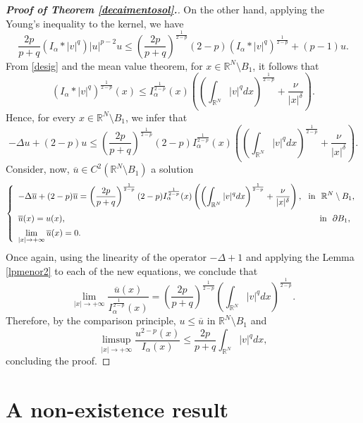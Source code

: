 \documentclass[12pt,a4paper]{article}
\numberwithin{equation}{section}
\begin{document}
\begin{proof}[\textbf{Proof of Theorem \ref{decaimentosol}.}]
On the other hand, applying the Young's inequality to the kernel, we have
$$
\dfrac{2p}{p+q}(I_\alpha \ast |v|^q)|u|^{p-2}u\leq \left(\dfrac{2p}{p+q}\right)^{\frac{1}{2-p}}(2-p)(I_\alpha \ast |v|^q)^{\frac{1}{2-p}}+(p-1)u. 
$$
From \eqref{desig} and the mean value theorem, for $x\in \mathbb{R}^N \setminus B_1$, it follows that
$$
(I_\alpha \ast |v|^q)^{\frac{1}{2-p}}(x) \leq I_{\alpha}^{\frac{1}{2-p}}(x)\left( \left(\int_{\mathbb{R}^N}|v|^q dx \right)^{\frac{1}{2-p}}+\dfrac{\nu}{|x|^\delta}\right).
$$
Hence, for every $x\in \mathbb{R}^N \setminus B_1$, we infer that
$$
    -\Delta u + (2-p)u  \leq \left(\dfrac{2p}{p+q}\right)^{\frac{1}{2-p}}(2-p)I_{\alpha}^{\frac{1}{2-p}}(x)\left( \left(\int_{\mathbb{R}^N}|v|^q dx \right)^{\frac{1}{2-p}}+\dfrac{\nu}{|x|^\delta}\right).
$$
Consider, now, $\overline{u}\in C^2(\mathbb{R}^N \setminus B_1)$ a solution 
$$
\left\{
\begin{array}{lll}
     -\Delta \overline{u} + (2-p)\overline{u} = \left(\dfrac{2p}{p+q}\right)^{\frac{1}{2-p}}(2-p)I_{\alpha}^{\frac{1}{2-p}}(x)\displaystyle\left( \left(\int_{\mathbb{R}^N}|v|^q dx \right)^{\frac{1}{2-p}}+\dfrac{\nu}{|x|^\delta}\right), \mbox{ \ in \ } \mathbb{R}^N \setminus B_1, \vspace{5pt}\\
     \overline{u}(x)=u(x), \ \ \ \ \ \ \ \ \ \ \ \ \ \ \ \ \ \ \ \ \ \ \ \ \ \ \ \ \ \ \ \ \ \ \ \ \ \ \ \ \ \ \ \ \ \ \ \ \ \ \ \ \ \ \ \ \ \ \ \ \ \ \ \ \ \ \ \ \ \ \ \ \ \ \ \ \ \ \ \ \ \ \ \ \ \ \  \mbox{ \ in \ } \partial B_1, \vspace{5pt}\\
     \lim\limits_{|x|\rightarrow +\infty}\overline{u}(x)=0.
\end{array}
\right.
$$
Once again, using the linearity of the operator $-\Delta +1$ and applying the Lemma \ref{lpmenor2} to each of the new equations, we conclude that
$$
\lim\limits_{|x|\rightarrow +\infty} \dfrac{\overline{u}(x)}{I_{\alpha}^{\frac{1}{2-p}}(x)}= \left(\dfrac{2p}{p+q}\right)^{\frac{1}{2-p}} \left(\int_{\mathbb{R}^N}|v|^q dx \right)^{\frac{1}{2-p}}.
$$
Therefore, by the comparison principle, $u\leq \overline{u}$ in $\mathbb{R}^N \setminus B_1$ and
$$
\limsup\limits_{|x|\rightarrow +\infty}\dfrac{u^{2-p}(x)}{I_\alpha(x)}\leq \dfrac{2p}{p+q}\int_{\mathbb{R}^N}|v|^q dx,
$$
concluding the proof. 
\end{proof}



\section{A non-existence result}\label{sec-NE}
\end{document}
